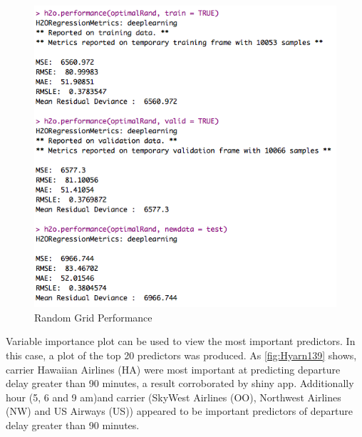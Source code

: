 \documentclass[12pt,twoside]{amherstthesis}
\begin{document}
  \begin{figure}[htbp]
  \centering
  \includegraphics[scale = 0.8,angle = 0]{figure/DeepGridPerformRand.png}
  \caption[Random Grid Performance]{\normalsize{Random Grid Performance}}
  \label{fig:Hyarn124}
  \end{figure}
  
  Variable importance plot can be used to view the most important
  predictors. In this case, a plot of the top 20 predictors was produced.
  As \autoref{fig:Hyarn139} shows, carrier Hawaiian Airlines (HA) were
  most important at predicting departure delay greater than 90 minutes, a
  result corroborated by shiny app. Additionally hour (5, 6 and 9 am)and
  carrier (SkyWest Airlines (OO), Northwest Airlines (NW) and US Airways
  (US)) appeared to be important predictors of departure delay greater
  than 90 minutes.
  
  \begin{Shaded}
  \begin{Highlighting}[]
   \NormalTok{)}
  \end{Highlighting}
  \end{Shaded}
  
\end{document}
